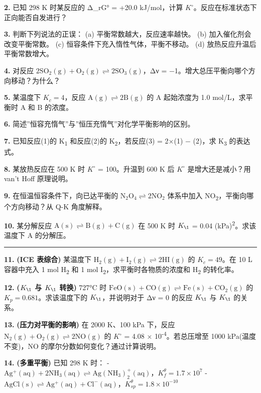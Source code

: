 \documentclass[a4paper,11pt]{ctexart}
\begin{document}
\textbf{2.} 已知 298 K 时某反应的 Δ\_rG° = +20.0 kJ/mol，计算 \(K^{\circ}\)。反应在标准状态下正向能否自发进行？

\textbf{3.} 判断下列说法的正误：
(a) 平衡常数越大，反应速率越快。
(b) 加入催化剂会改变平衡常数。
(c) 恒容条件下充入惰性气体，平衡不移动。
(d) 放热反应升温后平衡常数增大。

\textbf{4.} 对反应 \(\mathrm{2SO_2(g) + O_2(g) \rightleftharpoons 2SO_3(g)}\)，Δν = −1。增大总压平衡向哪个方向移动？为什么？

\textbf{5.} 某温度下 \(K_c = 4\)，反应 \(\mathrm{A(g) \rightleftharpoons 2B(g)}\) 的 A 起始浓度为 1.0 mol/L，求平衡时 A 和 B 的浓度。

\textbf{6.} 简述''恒容充惰气''与''恒压充惰气''对化学平衡影响的区别。

\textbf{7.} 已知反应(1)的 K\textsubscript{1} 和反应(2)的 K\textsubscript{2}，若反应(3) = 2×(1) − (2)，求 K\textsubscript{3} 的表达式。

\textbf{8.} 某放热反应在 500 K 时 \(K^{\circ}\) = 100。升温到 600 K 后 \(K^{\circ}\) 是增大还是减小？用 van't Hoff 原理说明。

\textbf{9.} 在恒温恒容条件下，向已达平衡的 \(\mathrm{N_2O_4 \rightleftharpoons 2NO_2}\) 体系中加入 NO\textsubscript{2}，平衡向哪个方向移动？从 Q-K 角度解释。

\textbf{10.} 某分解反应 \(\mathrm{A(s) \rightleftharpoons B(g) + C(g)}\) 在 500 K 时 \(K_{\1}\) = 0.04 (kPa)\textsuperscript{2}。求该温度下 A 的分解压。

\begin{center}\rule{0.5\linewidth}{0.5pt}\end{center}

\textbf{11.} \textbf{(ICE 表综合)} 某温度下 \(\mathrm{H_2(g) + I_2(g) \rightleftharpoons 2HI(g)}\) 的 \(K_c = 49\)。在 10 L 容器中充入 1 mol H\textsubscript{2} 和 1 mol I\textsubscript{2}，求平衡时各物质的浓度和 H\textsubscript{2} 的转化率。

\textbf{12.} \textbf{(\(K_{\1}\) 与 \(K_{\1}\) 转换)} 727°C 时 \(\mathrm{FeO(s) + CO(g) \rightleftharpoons Fe(s) + CO_2(g)}\) 的 \(K_p = 0.681\)。求该温度下的 \(K_{\1}\)，并说明对于 Δν = 0 的反应 \(K_{\1}\) 与 \(K_{\1}\) 的关系。

\textbf{13.} \textbf{(压力对平衡的影响)} 在 2000 K、100 kPa 下，反应 \(\mathrm{N_2(g) + O_2(g) \rightleftharpoons 2NO(g)}\) 的 \(K^{\circ}\) = 4.08 × 10\textsuperscript{-4}。若总压增至 1000 kPa(温度不变)，NO 的摩尔分数如何变化？通过计算说明。

\textbf{14.} \textbf{(多重平衡)} 已知 298 K 时：
- \(\mathrm{Ag^+(aq) + 2NH_3(aq) \rightleftharpoons Ag(NH_3)_2^+(aq)}\)，\(K_f^\theta = 1.7 \times 10^7\)
- \(\mathrm{AgCl(s) \rightleftharpoons Ag^+(aq) + Cl^-(aq)}\)，\(K_{sp}^\theta = 1.8 \times 10^{-10}\)
\end{document}
